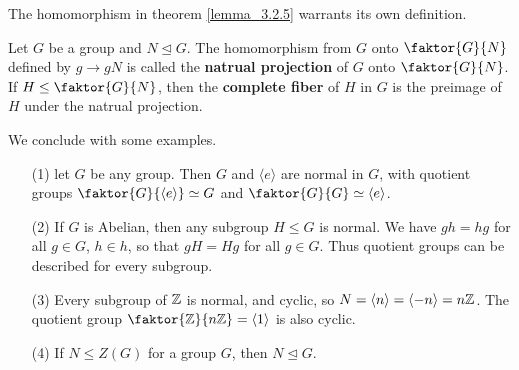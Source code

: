 The homomorphism in theorem \ref{lemma_3.2.5} warrants its own definition.

\begin{definition}
  Let $G$ be a group and  $N \unlhd G$. The homomorphism from $G$ onto
  $\faktor{G}{N}$ defined by $g \rightarrow gN$ is called the \textbf{natrual
  projection} of $G$ onto  $\faktor{G}{N}$. If $H \leq \faktor{G}{N}$, then
  the \textbf{complete fiber} of $H$ in  $G$ is the preimage of $H$ under the
  natrual projection.
\end{definition}

We conclude with some examples.

\begin{example}\label{example_3.4}
  \begin{enumerate}
    \item[(1)] let $G$ be any group. Then $G$ and $\langle e \rangle$ are normal
      in $G$, with quotient groups $\faktor{G}{\langle e \rangle} \simeq G$ and
      $\faktor{G}{G} \simeq \langle e \rangle$.

    \item[(2)] If $G$ is Abelian, then any subgroup  $H \leq G$ is normal.
      We have  $gh=hg$ for all  $g \in G$,  $h \in h$, so that  $gH=Hg$
      for all  $g \in G$. Thus quotient groups can be described for every
      subgroup.

    \item [(3)] Every subgroup of $\mathbb{Z}$ is normal, and cyclic, so
      $N=\langle n \rangle=\langle -n \rangle=n\mathbb{Z}$. The quotient group
      $\faktor{\Z}{n\Z}=\langle 1 \rangle$ is also cyclic.

    \item[(4)] If $N \leq Z(G)$ for a group $G$, then  $N \unlhd G$.
  \end{enumerate}
\end{example}
